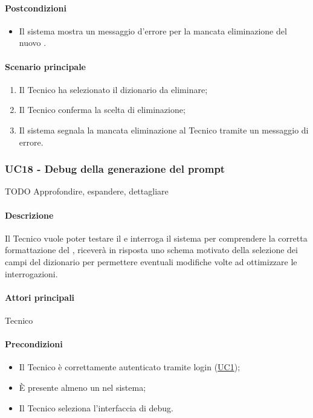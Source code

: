 \paragraph*{Postcondizioni}
\begin{itemize}
  \item Il sistema mostra un messaggio d’errore per la mancata eliminazione del nuovo .
\end{itemize}
\paragraph*{Scenario principale}
\begin{enumerate}
  \item Il Tecnico ha selezionato il dizionario da eliminare;
  \item Il Tecnico conferma la scelta di eliminazione;
  \item Il sistema segnala la mancata eliminazione al Tecnico tramite un messaggio di errore.
\end{enumerate}


\subsubsection{UC18 - Debug della generazione del prompt}\label{UC18}
TODO Approfondire, espandere, dettagliare
\paragraph*{Descrizione} Il Tecnico vuole poter testare il  e interroga il sistema per comprendere la corretta formattazione del , riceverà in risposta uno schema motivato della selezione dei campi del dizionario per permettere eventuali modifiche volte ad ottimizzare le interrogazioni.

\paragraph*{Attori principali} Tecnico

\paragraph*{Precondizioni}
\begin{itemize}
  \item Il Tecnico è correttamente autenticato tramite login (\hyperref[UC1]{UC1});
  \item È presente almeno un  nel sistema;
  \item Il Tecnico seleziona l’interfaccia di debug.
\end{itemize}

